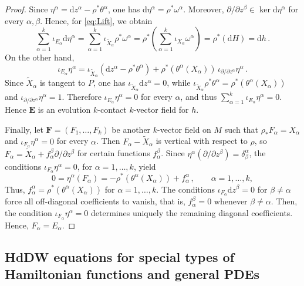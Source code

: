 \documentclass[11pt,twoside]{article}
\theoremstyle{plain}
\theoremstyle{definition}
\theoremstyle{remark}
\newcommand{\dd}{\mathrm{d}}
\renewcommand{\d}{\mathrm{d}}
\begin{document}
\begin{proof}
Since \(\eta^\alpha = \d z^\alpha-\rho^*\theta^\alpha\), one has \(\d\eta^\alpha=\rho^*\omega^\alpha\). Moreover, \(\partial/\partial z^\beta\in\ker \d\eta^\alpha\) for every \(\alpha,\beta\). Hence, for \eqref{eq:Lift}, 
we obtain
\[
\sum_{\alpha=1}^k\iota_{E_\alpha}\d\eta^\alpha=\sum_{\alpha=1}^k\iota_{\widetilde X_\alpha}\rho^*\omega^\alpha=\rho^*\!\left(\sum_{\alpha=1}^k\iota_{X_\alpha}\omega^\alpha\right)=\rho^*(\d H) = \d h\,.
\]
On the other hand,
\[
\iota_{E_\alpha}\eta^\alpha=\iota_{\widetilde X_\alpha}(\d z^\alpha-\rho^*\theta^\alpha)+\rho^*(\theta^\alpha(X_\alpha))\,\iota_{\partial/\partial z^\alpha}\eta^\alpha\,.
\]
Since \(\widetilde X_\alpha\) is tangent to \(P\), one has \(\iota_{\widetilde X_\alpha}\d z^\alpha=0\), while \(\iota_{\widetilde X_\alpha}\rho^*\theta^\alpha=\rho^*(\theta^\alpha(X_\alpha))\) and \(\iota_{\partial/\partial z^\alpha}\eta^\alpha=1\). Therefore \(\iota_{E_\alpha}\eta^\alpha=0\) for every \(\alpha\), and thus \(\sum_{\alpha=1}^k\iota_{E_\alpha}\eta^\alpha=0\). Hence \(\mathbf E\) is an evolution \(k\)-contact \(k\)-vector field for \(h\).

Finally, let \(\mathbf F=(F_1,\dots,F_k)\) be another \(k\)-vector field on \(M\) such that \(\rho_*F_\alpha=X_\alpha\) and \(\iota_{F_\alpha}\eta^\alpha=0\) for every \(\alpha\). Then \(F_\alpha-\widetilde X_\alpha\) is vertical with respect to \(\rho\), so \(F_\alpha=\widetilde X_\alpha+f_\alpha^\beta\partial/\partial z^\beta\) for certain functions \(f_\alpha^\beta\). Since \(\eta^\alpha(\partial/\partial z^\beta)=\delta^\alpha_\beta\), the conditions \(\iota_{F_\alpha}\eta^\alpha=0\), for $\alpha=1,\ldots,k$, yield
\[
0=\eta^\alpha(F_\alpha)=-\rho^*(\theta^\alpha(X_\alpha))+f_\alpha^\alpha\,,\qquad \alpha=1,\ldots,k,
\]
Thus, \(f_\alpha^\alpha=\rho^*(\theta^\alpha(X_\alpha))\) for $\alpha=1,\ldots,k$.  The conditions \(\iota_{F_\alpha}\dd z^\beta=0\) for \(\beta\neq\alpha\) force all off-diagonal coefficients to vanish, that is, \(f_\alpha^\beta=0\) whenever \(\beta\neq\alpha\). Then, the condition \(\iota_{F_\alpha}\eta^\alpha=0\) determines uniquely the remaining diagonal coefficients. 
Hence, \(F_\alpha=E_\alpha\).
\end{proof}


\subsection{HdDW equations for special types of Hamiltonian functions and general PDEs}\label{Sec:SpecialTypes}
\end{document}
